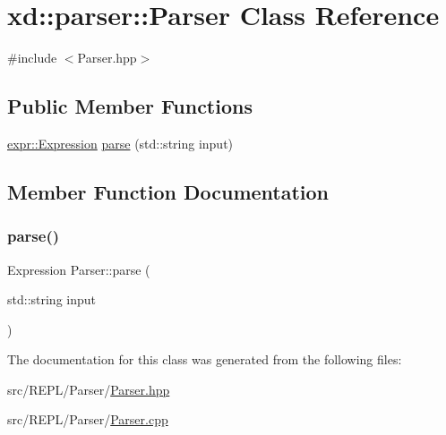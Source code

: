 \hypertarget{classxd_1_1parser_1_1_parser}{}\section{xd\+:\+:parser\+:\+:Parser Class Reference}
\label{classxd_1_1parser_1_1_parser}


{\ttfamily \#include $<$Parser.\+hpp$>$}

\subsection*{Public Member Functions}
\begin{DoxyCompactItemize}
\item 
\mbox{\hyperlink{namespacexd_1_1parser_1_1expr_a5ac81194bba038e6a1c652c9d95288d6}{expr\+::\+Expression}} \mbox{\hyperlink{classxd_1_1parser_1_1_parser_a7d6dc2cb647afa48214f3e53f2201a5f}{parse}} (std\+::string input)
\end{DoxyCompactItemize}


\subsection{Member Function Documentation}
\mbox{\label{classxd_1_1parser_1_1_parser_a7d6dc2cb647afa48214f3e53f2201a5f}} 
\subsubsection{\texorpdfstring{parse()}{parse()}}
{\footnotesize\ttfamily Expression Parser\+::parse (\begin{DoxyParamCaption}\item[{std\+::string}]{input }\end{DoxyParamCaption})}



The documentation for this class was generated from the following files\+:\begin{DoxyCompactItemize}
\item 
src/\+R\+E\+P\+L/\+Parser/\mbox{\hyperlink{_parser_8hpp}{Parser.\+hpp}}\item 
src/\+R\+E\+P\+L/\+Parser/\mbox{\hyperlink{_parser_8cpp}{Parser.\+cpp}}\end{DoxyCompactItemize}
